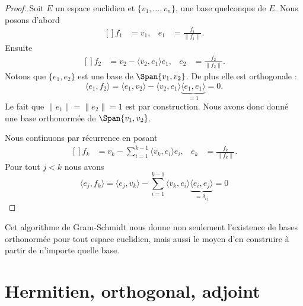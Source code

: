 \begin{proof}
    Soit \( E\) un espace euclidien et \( \{ v_1,\ldots, v_n \}\), une base quelconque de \( E\). Nous posons d'abord
    \begin{equation}
        \begin{aligned}[]
            f_1&=v_1,&e_1&=\frac{ f_1 }{ \| f_1 \| }.
        \end{aligned}
    \end{equation}
    Ensuite
    \begin{equation}
        \begin{aligned}[]
            f_2&=v_2-\langle v_2, e_1\rangle e_1,&e_2&=\frac{ f_2 }{ \| f_2 \| }.
        \end{aligned}
    \end{equation}
    Notons que \( \{ e_1,e_2 \}\) est une base de \( \Span\{ v_1,v_2 \}\). De plus elle est orthogonale :
    \begin{equation}
        \langle e_1, f_2\rangle =\langle e_1, v_2\rangle -\langle v_2, e_1\rangle \underbrace{\langle e_1, e_1\rangle}_{=1} =0.
    \end{equation}
    Le fait que \( \| e_1 \|=\| e_2 \|=1\) est par construction. Nous avons donc donné une base orthonormée de \( \Span\{ v_1,v_2 \}\).

    Nous continuons par récurrence en posant
    \begin{equation}
        \begin{aligned}[]
            f_k&=v_k-\sum_{i=1}^{k-1}\langle v_k, e_i\rangle e_i,&e_k&=\frac{ f_k }{ \| f_k \| }.
        \end{aligned}
    \end{equation}
    Pour tout \( j<k\) nous avons
    \begin{equation}
        \langle e_j, f_k\rangle =\langle e_j, v_k\rangle -\sum_{i=1}^{k-1}\langle v_k, e_i\rangle \underbrace{\langle e_i, e_j\rangle}_{=\delta_{ij}} =0
    \end{equation}
\end{proof}
Cet algorithme de Gram-Schmidt nous donne non seulement l'existence de bases orthonormée pour tout espace euclidien, mais aussi le moyen d'en construire à partir de n'importe quelle base.

\section{Hermitien, orthogonal, adjoint}


